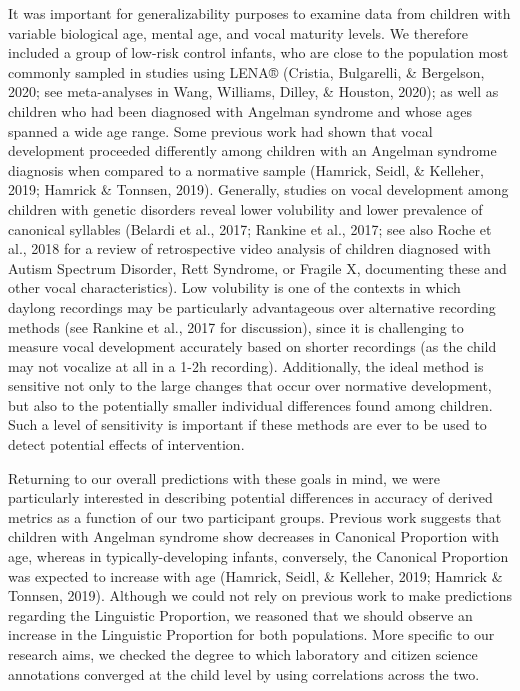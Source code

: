 \documentclass[
  english,
  ,man]{apa6}
\begin{document}
It was important for generalizability purposes to examine data from children with variable biological age, mental age, and vocal maturity levels. We therefore included a group of low-risk control infants, who are close to the population most commonly sampled in studies using LENA® (Cristia, Bulgarelli, \& Bergelson, 2020; see meta-analyses in Wang, Williams, Dilley, \& Houston, 2020); as well as children who had been diagnosed with Angelman syndrome and whose ages spanned a wide age range. Some previous work had shown that vocal development proceeded differently among children with an Angelman syndrome diagnosis when compared to a normative sample (Hamrick, Seidl, \& Kelleher, 2019; Hamrick \& Tonnsen, 2019). Generally, studies on vocal development among children with genetic disorders reveal lower volubility and lower prevalence of canonical syllables (Belardi et al., 2017; Rankine et al., 2017; see also Roche et al., 2018 for a review of retrospective video analysis of children diagnosed with Autism Spectrum Disorder, Rett Syndrome, or Fragile X, documenting these and other vocal characteristics). Low volubility is one of the contexts in which daylong recordings may be particularly advantageous over alternative recording methods (see Rankine et al., 2017 for discussion), since it is challenging to measure vocal development accurately based on shorter recordings (as the child may not vocalize at all in a 1-2h recording). Additionally, the ideal method is sensitive not only to the large changes that occur over normative development, but also to the potentially smaller individual differences found among children. Such a level of sensitivity is important if these methods are ever to be used to detect potential effects of intervention.

Returning to our overall predictions with these goals in mind, we were particularly interested in describing potential differences in accuracy of derived metrics as a function of our two participant groups. Previous work suggests that children with Angelman syndrome show decreases in Canonical Proportion with age, whereas in typically-developing infants, conversely, the Canonical Proportion was expected to increase with age (Hamrick, Seidl, \& Kelleher, 2019; Hamrick \& Tonnsen, 2019). Although we could not rely on previous work to make predictions regarding the Linguistic Proportion, we reasoned that we should observe an increase in the Linguistic Proportion for both populations. More specific to our research aims, we checked the degree to which laboratory and citizen science annotations converged at the child level by using correlations across the two.
\end{document}
